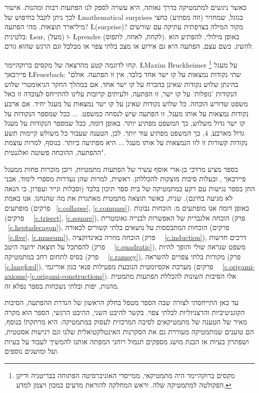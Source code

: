 כאשר ניגשים למתמטיקה בדרך נאותה, היא עשויה לספק לנו הפתעות רבות ומהנות. אישור לכך ניתן לקבל בחיפוש של 
\L{mathematical surprises}
בגוגל, שמחזיר (וזה מפתיע) כחצי מיליארד תוצאות. מהי הפתעה?
\L{(surprise)}?
מקור המילה בצרפתית עתיקה עם שורשים בלטינית: 
\L{sur},
(מעל) ו-
\L{prendre}
(לקחת, לאחוז, לתפוס). באופן מילולי, להפתיע הוא להשיג. כשם עצם, הפתעה היא גם אירוע או מצב בלתי צפוי או מבלבל וגם הרגש שהוא גורם.


קחו לדוגמה קטע מהרצאה של מקסים ברוקהיימר.
\L{Maxim Bruckheimer}%
\footnote{מקסים ברוקהיימר היה מתמטיקאי, ממייסדי האוניברסיטה הפתוחה בבריטניה ודיקן הפקולטה למתמטיקה שלה. 
וראש המחלקה להוראת מדעים במכון ויצמן למדע.}
על מעגל פיירבאך
\L{Feuerbach}:
"שתי נקודות נמצאות על קו ישר אחד בלבד, אין זו הפתעה. אולם בהינתן שלוש נקודות שאינן בהכרח על קו ישר אחד, אם במהלך החקר הגיאומטרי שלוש הנקודות 'נופלות' על קו ישר, זו הפתעה, ולעיתים קרובות עלינו להתייחס לעובדה זו כאל משפט שדורש הוכחה. כל שלוש נקודות שאינן על קו ישר נמצאות על מעגל יחיד. אם ארבע נקודות נמצאות על אותו מעגל, זו הפתעה שיש לנסחה כמשפט.
$\ldots$
ככל שמספר הנקודות על קו ישר גדול משלוש, כך המשפט מפתיע יותר. באופן דומה, ככל שמספר הנקודות על מעגל גדול מארבע,
$4$,
כך המשפט מפתיע עוד יותר. לכן, הטענה שעבור כל משולש קיימות תשע נקודות קשורות זו לזו הנמצאות על אותו מעגל 
$\ldots$
היא מפתיעה ביותר. בנוסף, למרות עוצמת ההפתעה, ההוכחה פשוטה ואלגנטית".

בספר מציע מרדכי בן-ארי אוסף עשיר של הפתעות מתמטיות, רובן מוכרות פחות ממעגל פיירבאך 
,
ובעלות סיבות מוצקות להכללתן. ראשית, למרות שהן נעדרות מספרי לימוד, אבני החן בספר נגישות עם רקע במתמטיקה של בית ספר תיכון בלבד (וסבלות ונייר ועפרון, כי הנאה לא מגיעה בחינם). שנית, כאשר תוצאה מתמטית מאתגרת את מה שהנחנו, אנו באמת מופתעים (פרקים~%
\ref{c.collapse}, \ref{c.compass}).
באופן דומה אנו מופתעים מ: הוכחות נבונות (פרקים~%
~\ref{c.trisect}, \ref{c.square}),
הוכחה אלגברית של האפשרות לבנייה גאומטרית (פרק~%
~\ref{c.heptadecagon}),
הוכחות המתבססות על נושאים בלתי קשורים לכאורה (פרקים~%
~\ref{c.five}, \ref{c.museum}),
הוכחה מוזרה באינדוקציה (פרק~%
~\ref{c.induction}),
דרכים חדשות להסתכל על תוצאה ידועה היטב (פרק~%
~\ref{c.quadratic}),
משפט שנראה שולי והופך להיות בסיס לתחום רחב במתמטיקה (פרק~%
~\ref{c.ramsey}),
מקורות בלתי צפויים להשראה (פרק~%
\ref{c.langford}),
מערכת אקסיומטית הנובעת מפעילות פנאי כגון אוריגמי (פרקים~%
~\ref{c.origami-axioms}-\ref{c.origami-constructions}).
אלו הסיבות השונות להכללת הפתעות מתמטית מהנות, יפות ובלתי נשכחות בספר נפלא זה.

עד כאן התייחסתי לצורה שבה הספר מטפל בחלק הראשון של הגדרת ההפתעה, הסיבות הקוגניטיביות והרצניוליות לבלתי צפוי. בקשר להיבט השני, ההיבט הרגשי, הספר הוא מקרה מאיר של הטענה של מתמטיקאים לסיבה המרכזית לעסוק במתמטיקה: היא מרתקת! בנוסף, הם טוענים שמתמטיקה מעוררת גם את הסקרנות האינטלקטואלית שלנו וגם רגישות אסטטית, ושפתרון בעיות או הבנת מושג מספקים תגמול רוחני המפתה אותנו להמשיך לעבוד על בעיות ועל ומושגים נוספים.


